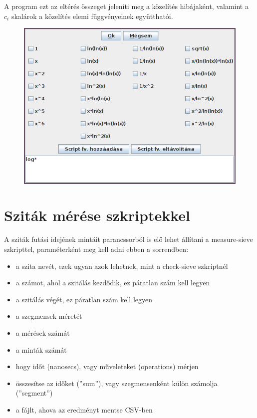 A program ezt az eltérés összeget jeleníti meg a közelítés
hibájaként, valamint a $c_i$ skalárok
a közelítés elemi függvényeinek együtthatói.

\begin{figure}[h]
\centering
\includegraphics[scale=0.75]{functions}
\end{figure}

\section{Sziták mérése szkriptekkel}

A sziták futási idejének mintáit parancssorból is elő lehet állítani
a measure-sieve szkripttel, paraméterként meg kell adni ebben a sorrendben:

\begin{itemize}
\item a szita nevét, ezek ugyan azok lehetnek, mint a check-sieve szkriptnél
\item a számot, ahol a szitálás kezdődik, ez páratlan szám kell legyen
\item a szitálás végét, ez páratlan szám kell legyen
\item a szegmensek méretét
\item a mérések számát
\item a minták számát
\item hogy időt (nanosecs), vagy műveleteket (operations) mérjen
\item összesítse az időket (''sum''), vagy szegmensenként külön számolja (''segment'')
\item a fájlt, ahova az eredményt mentse CSV-ben
\end{itemize}

